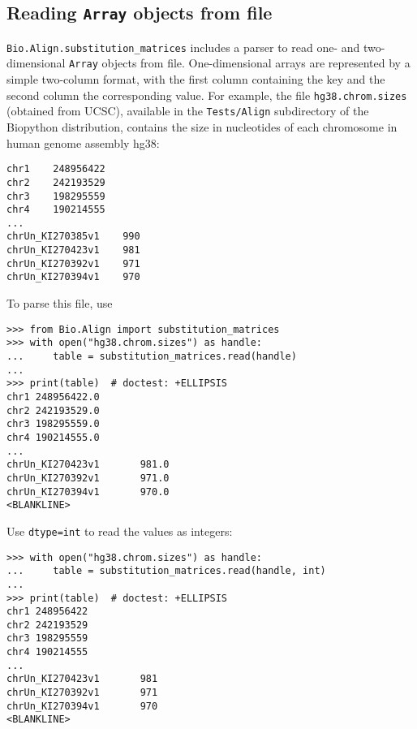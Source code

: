 \subsection{Reading \texttt{Array} objects from file}

\verb+Bio.Align.substitution_matrices+ includes a parser to read one- and two-dimensional \verb+Array+ objects from file. One-dimensional arrays are represented by a simple two-column format, with the first column containing the key and the second column the corresponding value. For example, the file \verb+hg38.chrom.sizes+ (obtained from UCSC), available in the \verb+Tests/Align+ subdirectory of the Biopython distribution, contains the size in nucleotides of each chromosome in human genome assembly hg38:
\begin{verbatim}
chr1    248956422
chr2    242193529
chr3    198295559
chr4    190214555
...
chrUn_KI270385v1    990
chrUn_KI270423v1    981
chrUn_KI270392v1    971
chrUn_KI270394v1    970
\end{verbatim}
To parse this file, use

\begin{verbatim}
>>> from Bio.Align import substitution_matrices
>>> with open("hg38.chrom.sizes") as handle:
...     table = substitution_matrices.read(handle)
...
>>> print(table)  # doctest: +ELLIPSIS
chr1 248956422.0
chr2 242193529.0
chr3 198295559.0
chr4 190214555.0
...
chrUn_KI270423v1       981.0
chrUn_KI270392v1       971.0
chrUn_KI270394v1       970.0
<BLANKLINE>
\end{verbatim}
Use \verb+dtype=int+ to read the values as integers:

\begin{verbatim}
>>> with open("hg38.chrom.sizes") as handle:
...     table = substitution_matrices.read(handle, int)
...
>>> print(table)  # doctest: +ELLIPSIS
chr1 248956422
chr2 242193529
chr3 198295559
chr4 190214555
...
chrUn_KI270423v1       981
chrUn_KI270392v1       971
chrUn_KI270394v1       970
<BLANKLINE>
\end{verbatim}

